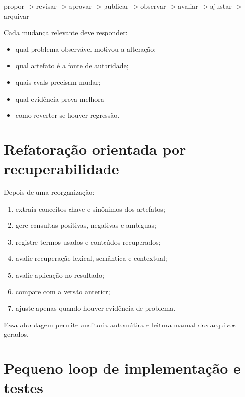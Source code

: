 \documentclass[
  10pt,
  a4paper,
  oneside]{book}
\newenvironment{Shaded}{}{}
\newcommand{\NormalTok}[1]{#1}
\providecommand{\tightlist}{%
  \setlength{\itemsep}{0pt}\setlength{\parskip}{0pt}}
\begin{document}
\begin{Shaded}
\begin{Highlighting}[]
\NormalTok{propor {-}\textgreater{} revisar {-}\textgreater{} aprovar {-}\textgreater{} publicar {-}\textgreater{} observar {-}\textgreater{} avaliar {-}\textgreater{} ajustar {-}\textgreater{} arquivar}
\end{Highlighting}
\end{Shaded}

Cada mudança relevante deve responder:

\begin{itemize}
\tightlist
\item
  qual problema observável motivou a alteração;
\item
  qual artefato é a fonte de autoridade;
\item
  quais evals precisam mudar;
\item
  qual evidência prova melhora;
\item
  como reverter se houver regressão.
\end{itemize}

\hypertarget{refatorauxe7uxe3o-orientada-por-recuperabilidade}{%
\section{Refatoração orientada por
recuperabilidade}\label{refatorauxe7uxe3o-orientada-por-recuperabilidade}}

Depois de uma reorganização:

\begin{enumerate}
\def\labelenumi{\arabic{enumi}.}
\tightlist
\item
  extraia conceitos-chave e sinônimos dos artefatos;
\item
  gere consultas positivas, negativas e ambíguas;
\item
  registre termos usados e conteúdos recuperados;
\item
  avalie recuperação lexical, semântica e contextual;
\item
  avalie aplicação no resultado;
\item
  compare com a versão anterior;
\item
  ajuste apenas quando houver evidência de problema.
\end{enumerate}

Essa abordagem permite auditoria automática e leitura manual dos
arquivos gerados.

\hypertarget{pequeno-loop-de-implementauxe7uxe3o-e-testes}{%
\section{Pequeno loop de implementação e
testes}\label{pequeno-loop-de-implementauxe7uxe3o-e-testes}}
\end{document}
